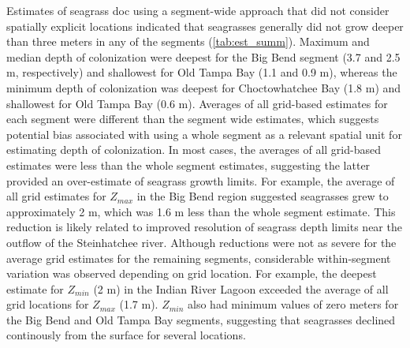 \documentclass[letterpaper,12pt,oneside]{article}\usepackage[]{graphicx}\usepackage[]{color}
\begin{document}
Estimates of seagrass \ac{doc} using a segment-wide approach that did not consider spatially explicit locations indicated that seagrasses generally did not grow deeper than three meters in any of the segments (\cref{tab:est_summ}).  Maximum and median depth of colonization were deepest for the Big Bend segment (3.7 and 2.5 m, respectively) and shallowest for Old Tampa Bay (1.1 and 0.9 m), whereas the minimum depth of colonization was deepest for Choctowhatchee Bay (1.8 m) and shallowest for Old Tampa Bay (0.6 m).  Averages of all grid-based estimates for each segment were different than the segment wide estimates, which suggests potential bias associated with using a whole segment as a relevant spatial unit for estimating depth of colonization.  In most cases, the averages of all grid-based estimates were less than the whole segment estimates, suggesting the latter provided an over-estimate of seagrass growth limits.  For example, the average of all grid estimates for $Z_{max}$ in the Big Bend region suggested seagrasses grew to approximately 2 m, which was 1.6 m less than the whole segment estimate.  This reduction is likely related to improved resolution of seagrass depth limits near the outflow of the Steinhatchee river.  Although reductions were not as severe for the average grid estimates for the remaining segments, considerable within-segment variation was observed depending on grid location.  For example, the deepest estimate for $Z_{min}$ (2 m) in the Indian River Lagoon exceeded the average of all grid locations for $Z_{max}$ (1.7 m).  $Z_{min}$ also had minimum values of zero meters for the Big Bend and Old Tampa Bay segments, suggesting that seagrasses declined continously from the surface for several locations.   
\end{document}
